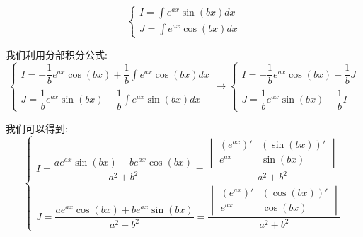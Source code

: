 \begin{theorem}[组合积分]
\begin{proposition}
	$$\begin{cases} I = \int e^{ax}\sin (bx)dx\\ J = \int e^{ax} \cos (bx)dx\end{cases}$$
\end{proposition}
\begin{solution}
	
	我们利用分部积分公式:
	$$\begin{cases} I = -\dfrac{1}{b}e^{ax}\cos (bx) + \dfrac{1}{b}\int e^{ax}\cos (bx) dx \\ J = \dfrac{1}{b}e^{ax}\sin (bx) - \dfrac{1}{b}\int e^{ax}\sin (bx) dx  \end{cases}\to 
	\begin{cases} I = -\dfrac{1}{b}e^{ax}\cos (bx) + \dfrac{1}{b}J \\ J = \dfrac{1}{b}e^{ax}\sin (bx) - \dfrac{1}{b}I  \end{cases}
	$$

	我们可以得到:
	$$
	\begin{cases} I = \dfrac{ae^{ax}\sin(bx)-be^{ax}\cos(bx)}{a^{2}+b^{2}} = \dfrac{\begin{vmatrix}(e^{ax})' & (\sin(bx))'\\ e^{ax} & \sin(bx)\end{vmatrix}}{a^{2}+b^{2}}\\ J = \dfrac{ae^{ax}\cos(bx) + be^{ax}\sin(bx)}{a^{2}+b^{2}} = \dfrac{\begin{vmatrix}(e^{ax})' & (\cos(bx))'\\ e^{ax} & \cos(bx)\end{vmatrix}}{a^{2}+b^{2}}   \end{cases}
	$$
\end{solution}
\end{theorem}

